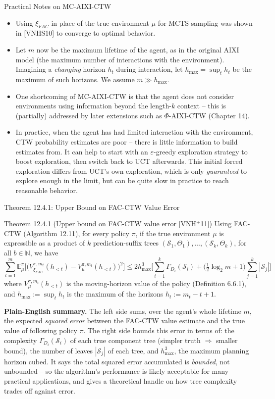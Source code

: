 \documentclass[aspectratio=169,10pt]{beamer}
\newcommand{\NN}{\mathbb{N}}
\newcommand{\EE}{\mathbb{E}}
\newcommand{\Scal}{\mathcal{S}}
\begin{document}
\begin{frame}{Practical Notes on MC-AIXI-CTW}
\begin{itemize}
\item Using $\xi_{FAC}$ in place of the true environment $\mu$ for MCTS sampling was shown
in [VNHS10] to converge to optimal behavior.
\item Let $m$ now be the maximum lifetime of the agent, as in the original AIXI model (the
maximum number of interactions with the environment). Imagining a \emph{changing} horizon
$h_t$ during interaction, let $h_{\max}=\sup_t h_t$ be the maximum of such horizons. We
assume $m\gg h_{\max}$.
\item One shortcoming of MC-AIXI-CTW is that the agent does not consider environments
using information beyond the length-$k$ context -- this is (partially) addressed by later
extensions such as $\Phi$-AIXI-CTW (Chapter 14).
\item In practice, when the agent has had limited interaction with the environment, CTW
probability estimates are poor -- there is little information to build estimates from. It
can help to start with an $\varepsilon$-greedy exploration strategy to boost exploration,
then switch back to UCT afterwards. This initial forced exploration differs from UCT's own
exploration, which is only \emph{guaranteed} to explore enough in the limit, but can be
quite slow in practice to reach reasonable behavior.
\end{itemize}
\end{frame}

\begin{frame}{Theorem 12.4.1: Upper Bound on FAC-CTW Value Error}
\begin{block}{Theorem 12.4.1 (Upper bound on FAC-CTW value error [VNH$^+$11])}
Using FAC-CTW (Algorithm 12.11), for every policy $\pi$, if the true environment $\mu$ is
expressible as a product of $k$ prediction-suffix trees
$(\Scal_1,\Theta_1),\ldots,(\Scal_k,\Theta_k)$, for all $b\in\NN$, we have
$$\sum_{t=1}^m \EE_\mu^\pi\Big[\big(V_{\xi_{FAC}}^{\pi,m_t}(h_{<t}) -
V_\mu^{\pi,m_t}(h_{<t})\big)^2\Big] \le 2h_{\max}^3\Big[\sum_{i=1}^k\Gamma_{D_i}(\Scal_i) +
\Big(\tfrac12\log_2 m+1\Big)\sum_{j=1}^k|\Scal_j|\Big]$$
where $V_\mu^{\pi,m_t}(h_{<t})$ is the moving-horizon value of the policy (Definition
6.6.1), and $h_{\max}:=\sup_t h_t$ is the maximum of the horizons $h_t:=m_t-t+1$.
\end{block}
\textbf{Plain-English summary.} The left side sums, over the agent's whole lifetime $m$,
the expected \emph{squared error} between the FAC-CTW value estimate and the true value
of following policy $\pi$. The right side bounds this error in terms of: the complexity
$\Gamma_{D_i}(\Scal_i)$ of each true component tree (simpler truth $\Rightarrow$ smaller
bound), the number of leaves $|\Scal_j|$ of each tree, and $h_{\max}^3$, the maximum
planning horizon cubed. It says the total squared error accumulated is \emph{bounded},
not unbounded -- so the algorithm's performance is likely acceptable for many practical
applications, and gives a theoretical handle on how tree complexity trades off against
error.
\end{frame}
\end{document}
